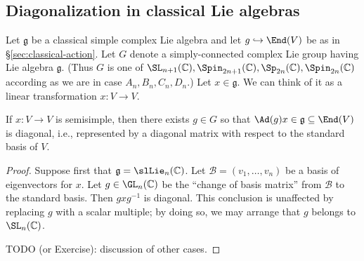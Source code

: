 \documentclass[reqno]{amsart} 
\begin{document}
\subsection{Diagonalization in classical Lie algebras\label{sec:classical-lie-alg-diagonalization}}
\label{sec:org67896e3}
Let $\mathfrak{g}$ be a classical simple complex Lie algebra and let $g \hookrightarrow \End(V)$ be as in \S\ref{sec:classical-action}.  Let $G$ denote a simply-connected complex Lie group having Lie algebra $\mathfrak{g}$.  (Thus $G$ is one of $\SL_{n+1}(\mathbb{C}), \Spin_{2n+1}(\mathbb{C}), \Sp_{2n}(\mathbb{C}), \Spin_{2n}(\mathbb{C})$ according as we are in case $A_n,B_n,C_n,D_n$.)  Let $x \in \mathfrak{g}$.  We can think of it as a linear transformation $x : V \rightarrow V$.
\begin{lemma}
  If $x : V \rightarrow V$ is semisimple, then there exists $g \in G$ so that $\Ad(g) x \in \mathfrak{g} \subseteq \End(V)$ is diagonal, i.e., represented by a diagonal matrix with respect to the standard basis of $V$.
\end{lemma}
\begin{proof}
  Suppose first that $\mathfrak{g} = \slLie_n(\mathbb{C})$.  Let $\mathcal{B} = (v_1,\dotsc,v_n)$ be a basis of eigenvectors for $x$.  Let $g \in \GL_n(\mathbb{C})$ be the ``change of basis matrix'' from $\mathcal{B}$ to the standard basis.  Then $g x g^{-1}$ is diagonal.  This conclusion is unaffected by replacing $g$ with a scalar multiple; by doing so, we may arrange that $g$ belongs to $\SL_n(\mathbb{C})$.

  TODO (or Exercise): discussion of other cases.


\end{proof}
\end{document}
